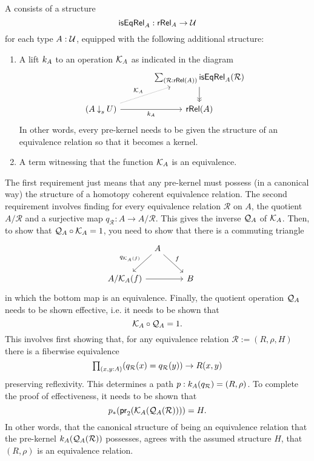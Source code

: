 \begin{defn}\label{defn:system}
A  consists of a structure
\begin{equation*}
\mathsf{isEqRel}_A:\mathsf{rRel}_A\to\mathcal{U}
\end{equation*}
for each type $A:\mathcal{U}$, equipped with the following additional structure:
\begin{enumerate}
\item A lift $k_A$ to an operation $\mathcal{K}_A$ as indicated in the diagram
\begin{equation*}
\begin{tikzcd}[column sep=large]
& \sm{\mathcal{R}:\mathsf{rRel}(A)}\mathsf{isEqRel}_A(\mathcal{R}) \arrow[d,->>] \\
(A \mathbin{{\downarrow}_s} U) \arrow[r,swap,"\prekersym_A"] \arrow[ur,densely dotted,"\kersym_A"] & \mathsf{rRel}(A)
\end{tikzcd}
\end{equation*}
In other words, every pre-kernel needs to be given the structure of an equivalence relation so that it becomes a kernel.
\item A term witnessing that the function $\mathcal{K}_A$ is an equivalence.
\end{enumerate}
\end{defn}

The first requirement just means that any pre-kernel must possess (in a canonical way) the structure of a homotopy coherent equivalence relation. The second requirement involves finding for every equivalence relation $\mathcal{R}$ on $A$, the quotient $A/\mathcal{R}$ and a surjective map $q_{\mathcal{R}} : A\to A/\mathcal{R}$. This gives the inverse $\mathcal{Q}_A$ of $\mathcal{K}_A$. Then, to show that $\mathcal{Q}_A\circ \mathcal{K}_A=1$, you need to show that there is a commuting triangle
\begin{equation*}
\begin{tikzcd}[column sep=tiny]
& A \arrow[dl,swap,"q_{\kersym_A(f)}"] \arrow[dr,"f"] & \phantom{A/\kersym_A(f)} \\
A/\kersym_A(f) \arrow[rr] & & B
\end{tikzcd}
\end{equation*}
in which the bottom map is an equivalence. Finally, the quotient operation $\mathcal{Q}_A$ needs to be shown effective, i.e. it needs to be shown that \[\mathcal{K}_A\circ \mathcal{Q}_A =1.\]
This involves first showing that, for any equivalence relation $\mathcal{R}:=(R,\rho,H)$ there is a fiberwise equivalence
\begin{equation*}
\prd{x,y:A} (q_{\mathcal{R}}(x)=q_{\mathcal{R}}(y)) \to{} R(x,y)
\end{equation*}
preserving reflexivity. This determines a path $p : k_A(q_{\mathcal{R}})=(R,\rho)$. To complete the proof of effectiveness, it needs to be shown that \[{p}_{*}\mathopen{}\left({\mathsf{pr}_2(\mathcal{K}_A(\mathcal{Q}_A(\mathcal{R})))}\right)\mathclose{}= H.\] 
In other words, that the canonical structure of being an equivalence relation that the pre-kernel $k_A(\mathcal{Q}_A(\mathcal{R}))$ possesses, agrees with the assumed structure $H$, that $(R,\rho)$ is an equivalence relation.

